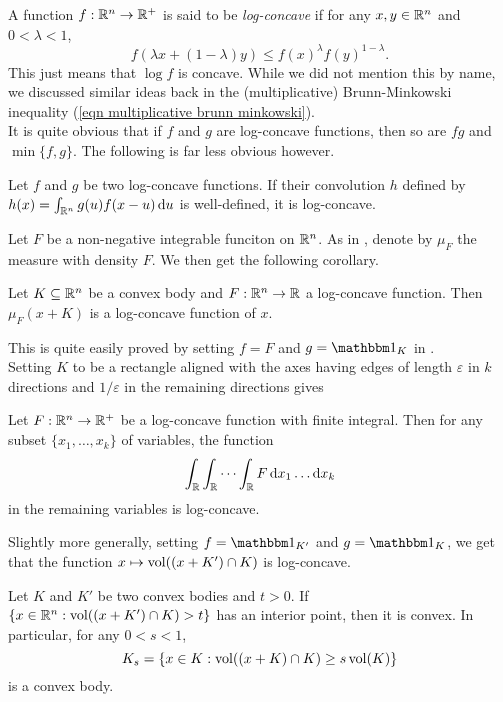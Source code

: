 A function $f:\mathbb{R}^n\to\mathbb{R}^+$ is said to be \textit{log-concave} if for any $x,y\in\mathbb{R}^n$ and $0<\lambda<1$,
\[ f(\lambda x + (1-\lambda)y) \leq f(x)^\lambda f(y)^{1-\lambda}. \]
This just means that $\log f$ is concave. While we did not mention this by name, we discussed similar ideas back in the (multiplicative) Brunn-Minkowski inequality (\ref{eqn multiplicative brunn minkowski}).\\

It is quite obvious that if $f$ and $g$ are log-concave functions, then so are $fg$ and $\min\{f,g\}$. The following is far less obvious however.

\begin{lemma}
\label{convolution of log concave functions is log concave}
	Let $f$ and $g$ be two log-concave functions. If their convolution $h$ defined by $h(x)=\int_{\mathbb{R}^n}g(u)f(x-u)\operatorname{d}\!{u}$ is well-defined, it is log-concave.
\end{lemma}

Let $F$ be a non-negative integrable funciton on $\mathbb{R}^n$. As in , denote by $\mu_F$ the measure with density $F$. We then get the following corollary.

\begin{corollary}
\label{F(x+K) log concave K convex}
	Let $K\subseteq\mathbb{R}^n$ be a convex body and $F:\mathbb{R}^n\to\mathbb{R}$ a log-concave function. Then $\mu_F(x+K)$ is a log-concave function of $x$.
\end{corollary}

This is quite easily proved by setting $f=F$ and $g=\indic_K$ in .\\

Setting $K$ to be a rectangle aligned with the axes having edges of length $\varepsilon$ in $k$ directions and $1/\varepsilon$ in the remaining directions gives

\begin{corollary}
	\label{cor: 4.30}
	Let $F:\mathbb{R}^n\to\mathbb{R}^+$ be a log-concave function with finite integral. Then for any subset $\{x_1,\ldots,x_k\}$ of variables, the function
	\[ \int_{\mathbb{R}} \int_{\mathbb{R}} \cdots \int_{\mathbb{R}} F \operatorname{d}\!{x}_1\ldots\operatorname{d}\!{x_k} \]
	in the remaining variables is log-concave.
\end{corollary}

Slightly more generally, setting $f=\indic_{K'}$ and $g=\indic_K$, we get that the function $x\mapsto \operatorname{vol}((x+K')\cap K)$ is log-concave.

\begin{corollary}
	Let $K$ and $K'$ be two convex bodies and $t>0$. If $\{x\in\mathbb{R}^n:\operatorname{vol}((x+K')\cap K)>t\}$ has an interior point, then it is convex. In particular, for any $0<s<1$,
	\[ K_s = \{x\in K : \operatorname{vol}((x+K)\cap K) \geq s\operatorname{vol}(K)\} \]
	is a convex body.
\end{corollary}


